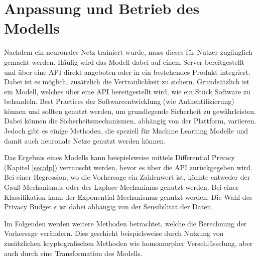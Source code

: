 \section{Anpassung und Betrieb des Modells}\label{sec:betrieb}

Nachdem ein neuronales Netz trainiert wurde, muss dieses für Nutzer zugänglich gemacht werden.
Häufig wird das Modell dabei auf einem Server bereitgestellt und über eine API direkt angeboten oder in ein bestehendes Produkt integriert.
Dabei ist es möglich, zusätzlich die Vertraulichkeit zu sichern.
Grundsätzlich ist ein Modell, welches über eine API bereitgestellt wird, wie ein Stück Software zu behandeln. 
Best Practices der Softwareentwicklung (wie \zB Authentifizierung) können und sollten genutzt werden, um grundlegende Sicherheit zu gewährleisten.
Dabei können die Sicherheitsmechanismen, abhängig von der Plattform, variieren.
Jedoch gibt es einige Methoden, die speziell für Machine Learning Modelle und damit auch neuronale Netze genutzt werden können.

Das Ergebnis eines Modells kann beispielsweise mittels Differential Privacy (Kapitel \ref{sec:dp}) verrauscht werden, bevor es über die API zurückgegeben wird. 
Bei einer Regression, wo die Vorhersage ein Zahlenwert ist, könnte entweder der Gauß-Mechanismus oder der Laplace-Mechanimus genutzt werden. 
Bei einer Klassifikation kann der Exponential-Mechanismus genutzt werden.
Die Wahl des Privacy Budget $\epsilon$ ist dabei abhängig von der Sensibilität der Daten.

Im Folgenden werden weitere Methoden betrachtet, welche die Berechnung der Vorhersage verändern.
Dies geschieht beispielsweise durch Nutzung von zusätzlichen kryptografischen Methoden wie homomorpher Verschlüsselung, aber auch durch eine Transformation des Modells.




